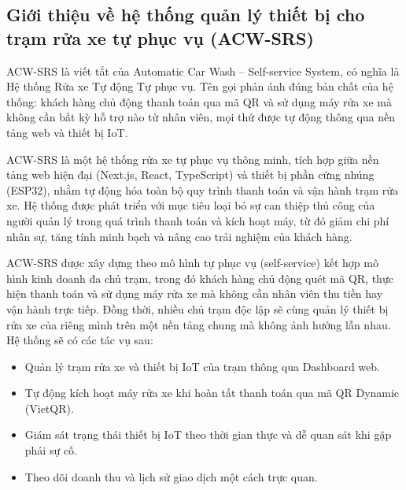 \documentclass[../main.tex]{subfiles}
\begin{document}
\subsection{Giới thiệu về hệ thống quản lý thiết bị cho trạm rửa xe tự phục vụ (ACW-SRS)}

ACW-SRS là viết tắt của Automatic Car Wash -- Self-service System, có nghĩa là Hệ thống Rửa xe Tự động Tự phục vụ. Tên gọi phản ánh đúng bản chất của hệ thống: khách hàng chủ động thanh toán qua mã QR và sử dụng máy rửa xe mà không cần bất kỳ hỗ trợ nào từ nhân viên, mọi thứ được tự động thông qua nền tảng web và thiết bị IoT.

ACW-SRS là một hệ thống rửa xe tự phục vụ thông minh, tích hợp giữa nền tảng web hiện đại (Next.js, React, TypeScript) và thiết bị phần cứng nhúng (ESP32), nhằm tự động hóa toàn bộ quy trình thanh toán và vận hành trạm rửa xe. Hệ thống được phát triển với mục tiêu loại bỏ sự can thiệp thủ công của người quản lý trong quá trình thanh toán và kích hoạt máy, từ đó giảm chi phí nhân sự, tăng tính minh bạch và nâng cao trải nghiệm của khách hàng.

ACW-SRS được xây dựng theo mô hình tự phục vụ (self-service) kết hợp mô hình kinh doanh đa chủ trạm, trong đó khách hàng chủ động quét mã QR, thực hiện thanh toán và sử dụng máy rửa xe mà không cần nhân viên thu tiền hay vận hành trực tiếp. Đồng thời, nhiều chủ trạm độc lập sẽ cùng quản lý thiết bị rửa xe của riêng mình trên một nền tảng chung mà không ảnh hưởng lẫn nhau. Hệ thống sẽ có các tác vụ sau:
\begin{itemize}
    \item Quản lý trạm rửa xe và thiết bị IoT của trạm thông qua Dashboard web.
    \item Tự động kích hoạt máy rửa xe khi hoàn tất thanh toán qua mã QR Dynamic (VietQR).
    \item Giám sát trạng thái thiết bị IoT theo thời gian thực và dễ quan sát khi gặp phải sự cố.
    \item Theo dõi doanh thu và lịch sử giao dịch một cách trực quan.
\end{itemize}
\end{document}
